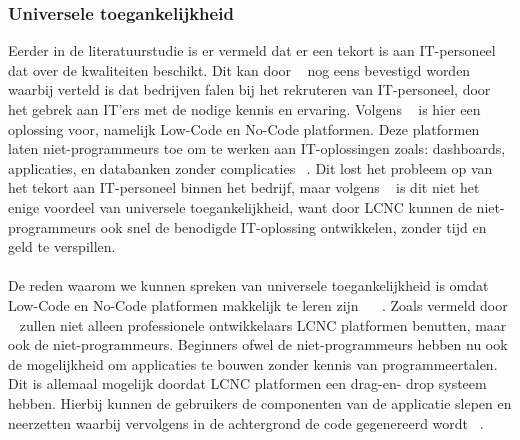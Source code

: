 \subsubsection{Universele toegankelijkheid}
\label{subsec:universele-toegankelijkheid}
Eerder in de literatuurstudie is er vermeld dat er een tekort is aan IT-personeel dat over de kwaliteiten beschikt. 
Dit kan door ~\textcite{Sufi_2023} nog eens bevestigd worden waarbij verteld is dat bedrijven falen bij het rekruteren van IT-personeel, door het gebrek aan 
IT'ers met de nodige kennis en ervaring. Volgens ~\textcite{Sufi_2023} is hier een oplossing voor, namelijk Low-Code en No-Code platformen. 
Deze platformen laten niet-programmeurs toe om te werken aan IT-oplossingen zoals: dashboards, applicaties, 
en databanken zonder complicaties ~\autocite{Sufi_2023}. Dit lost het probleem op van het tekort aan IT-personeel binnen het bedrijf, 
maar volgens ~\textcite{Sufi_2023} is dit niet het enige voordeel van universele toegankelijkheid, want door LCNC kunnen de niet-programmeurs ook snel de 
benodigde IT-oplossing ontwikkelen, zonder tijd en geld te verspillen.
\\
\\
De reden waarom we kunnen spreken van universele toegankelijkheid is omdat Low-Code en No-Code platformen makkelijk te leren zijn ~\autocite{ALSAADI_2021} ~\autocite{Sufi_2023}. 
Zoals vermeld door ~\textcite{ALSAADI_2021} zullen niet alleen professionele ontwikkelaars LCNC platformen benutten, maar ook de niet-programmeurs. 
Beginners ofwel de niet-programmeurs hebben nu ook de mogelijkheid om applicaties te bouwen zonder kennis van programmeertalen. 
Dit is allemaal mogelijk doordat LCNC platformen een drag-en- drop systeem hebben. Hierbij kunnen 
de gebruikers de componenten van de applicatie slepen en neerzetten waarbij vervolgens in de achtergrond de code gegenereerd wordt ~\autocite{ALSAADI_2021}.

